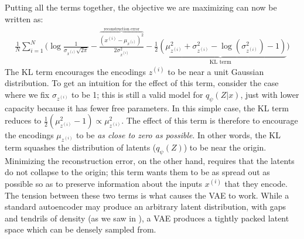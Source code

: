 Putting all the terms together, the objective we are maximizing can now be written as:
\begin{align}
     \frac{1}{N}\sum_{i=1}^N \Big( \log\frac{1}{\sigma_{x^{(i)}}\sqrt{2\pi}} - \frac{\overbrace{(x^{(i)} - \mu_{x^{(i)}})^2}^{\text{reconstruction error}}}{2\sigma_{x^{(i)}}^2} - \underbrace{\frac{1}{2}(\mu_{z^{(i)}}^2 + \sigma_{z^{(i)}}^2 - \log(\sigma_{z^{(i)}}^2) - 1)}_{\text{KL term}} \Big)
\end{align}
The KL term encourages the encodings $z^{(i)}$ to be near a unit Gaussian distribution. To get an intuition for the effect of this term, consider the case where we fix $\sigma_{z^{(i)}}$ to be 1; this is still a valid model for $q_{\psi}(Z|x)$, just with lower capacity because it has fewer free parameters. In this simple case, the KL term reduces to $\frac{1}{2}(\mu_{z^{(i)}}^2 - 1) \propto \mu_{z^{(i)}}^2$. The effect of this term is therefore to encourage the encodings $\mu_{z^{(i)}}$ to be \textit{as close to zero as possible}. In other words, the KL term squashes the distribution of latents ($q_{\psi}(Z)$) to be near the origin. Minimizing the reconstruction error, on the other hand, requires that the latents do not collapse to the origin; this term wants them to be as spread out as possible so as to preserve information about the inputs $x^{(i)}$ that they encode. The tension between these two terms is what causes the VAE to work. While a standard autoencoder may produce an arbitrary latent distribution, with gaps and tendrils of density (as we saw in \fig{\ref{fig:generative_modeling_and_representation_learning:autoencoder_complicated_latent_space}}), a VAE produces a tightly packed latent space which can be densely sampled from.










